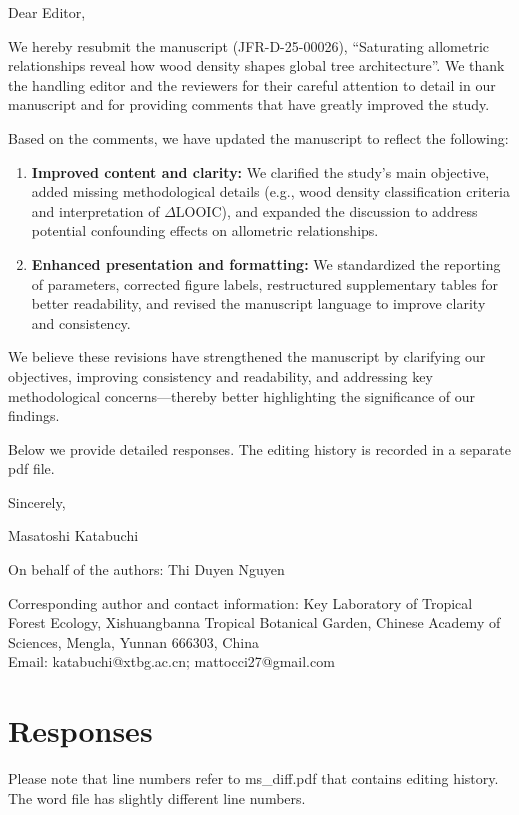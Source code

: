 \documentclass[
  12pt,
  letterpaper,
  DIV=11,
  numbers=noendperiod]{scrartcl}
\author{}
\date{2025-03-25}
\begin{document}
Dear Editor,

We hereby resubmit the manuscript (JFR-D-25-00026), ``Saturating
allometric relationships reveal how wood density shapes global tree
architecture''. We thank the handling editor and the reviewers for their
careful attention to detail in our manuscript and for providing comments
that have greatly improved the study.

Based on the comments, we have updated the manuscript to reflect the
following:

\begin{enumerate}
\def\labelenumi{\arabic{enumi}.}
\item
  \textbf{Improved content and clarity:} We clarified the study's main
  objective, added missing methodological details (e.g., wood density
  classification criteria and interpretation of \(\Delta\)LOOIC), and
  expanded the discussion to address potential confounding effects on
  allometric relationships.
\item
  \textbf{Enhanced presentation and formatting:} We standardized the
  reporting of parameters, corrected figure labels, restructured
  supplementary tables for better readability, and revised the
  manuscript language to improve clarity and consistency.
\end{enumerate}

We believe these revisions have strengthened the manuscript by
clarifying our objectives, improving consistency and readability, and
addressing key methodological concerns---thereby better highlighting the
significance of our findings.

Below we provide detailed responses. The editing history is recorded in
a separate pdf file.

Sincerely,

Masatoshi Katabuchi

On behalf of the authors: Thi Duyen Nguyen

Corresponding author and contact information: Key Laboratory of Tropical
Forest Ecology, Xishuangbanna Tropical Botanical Garden, Chinese Academy
of Sciences, Mengla, Yunnan 666303, China\\
Email: katabuchi@xtbg.ac.cn; mattocci27@gmail.com

\newpage

\section{Responses}\label{responses}

Please note that line numbers refer to ms\_diff.pdf that contains
editing history. The word file has slightly different line numbers.
\end{document}
